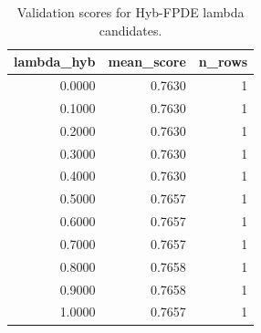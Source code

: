 \begin{table}[t]
\caption{Validation scores for Hyb-FPDE lambda candidates.}
\label{tab:lambda_distribution_computed}
\centering
\begin{tabular}{rrr}
\toprule
lambda\_hyb & mean\_score & n\_rows \\
\midrule
0.0000 & 0.7630 & 1 \\
0.1000 & 0.7630 & 1 \\
0.2000 & 0.7630 & 1 \\
0.3000 & 0.7630 & 1 \\
0.4000 & 0.7630 & 1 \\
0.5000 & 0.7657 & 1 \\
0.6000 & 0.7657 & 1 \\
0.7000 & 0.7657 & 1 \\
0.8000 & 0.7658 & 1 \\
0.9000 & 0.7658 & 1 \\
1.0000 & 0.7657 & 1 \\
\bottomrule
\end{tabular}

\end{table}
